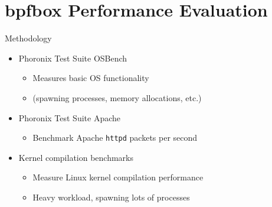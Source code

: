 \documentclass[12pt, dvipsnames, aspectratio=169]{beamer}
\begin{document}
%

\section{bpfbox Performance Evaluation}

\begin{frame}[c]{Methodology}
\begin{itemize}
    \item Phoronix Test Suite OSBench
    \begin{itemize}
        \item Measures basic OS functionality
        \item (spawning processes, memory allocations, etc.)
    \end{itemize}

    \vfill
    \item Phoronix Test Suite Apache
    \begin{itemize}
        \item Benchmark Apache \texttt{httpd} packets per second
    \end{itemize}

    \vfill
    \item Kernel compilation benchmarks
    \begin{itemize}
        \item Measure Linux kernel compilation performance
        \item Heavy workload, spawning lots of processes
    \end{itemize}
\end{itemize}
\end{frame}
\end{document}
